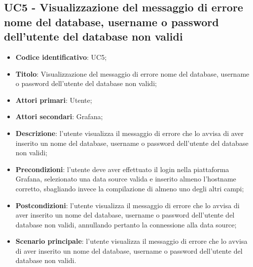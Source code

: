 \subsection{UC5 - Visualizzazione del messaggio di errore nome del database, username o password dell'utente del database non validi}
\begin{itemize}
    \item \textbf{Codice identificativo}: UC5;
    \item \textbf{Titolo}: Visualizzazione del messaggio di errore nome del database, username o password dell'utente del database non validi;
    \item \textbf{Attori primari}: Utente;
    \item \textbf{Attori secondari}: Grafana\glo;
    \item \textbf{Descrizione}: l'utente visualizza il messaggio di errore che lo avvisa di aver inserito un nome del database, username o password dell'utente                                       del database non validi;
    \item \textbf{Precondizioni}: l'utente deve aver effettuato il login nella piattaforma Grafana\glo, selezionato una data source valida e inserito almeno l'hostname                                 corretto, sbagliando invece la compilazione di almeno uno degli altri campi;
    \item \textbf{Postcondizioni}: l'utente visualizza il messaggio di errore che lo avvisa di aver inserito un nome del database, username o password dell'utente del                                   database non validi, annullando pertanto la connessione alla data source;
    \item \textbf{Scenario principale}: l'utente visualizza il messaggio di errore che lo avvisa di aver inserito un nome del database, username o password dell'utente                                       del database non validi.
\end{itemize}
